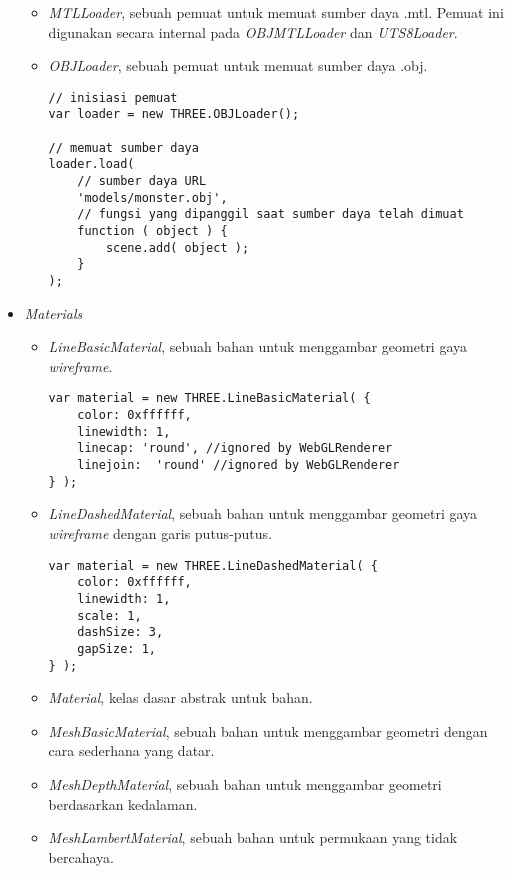 \begin{itemize}
\begin{itemize}
	\item {\it MTLLoader}, sebuah pemuat untuk memuat sumber daya .mtl. Pemuat ini digunakan secara internal pada {\it OBJMTLLoader} dan {\it UTS8Loader}.
	
	\item {\it OBJLoader}, sebuah pemuat untuk memuat sumber daya .obj.
	
\begin{lstlisting}
// inisiasi pemuat
var loader = new THREE.OBJLoader();

// memuat sumber daya
loader.load(
	// sumber daya URL
	'models/monster.obj',
	// fungsi yang dipanggil saat sumber daya telah dimuat
	function ( object ) {
		scene.add( object );
	}
);
\end{lstlisting}

	\end{itemize}

\item \textit{Materials}

	\begin{itemize}
	\item {\it LineBasicMaterial}, sebuah bahan untuk menggambar geometri gaya {\it wireframe}.
	
\begin{lstlisting}
var material = new THREE.LineBasicMaterial( {
	color: 0xffffff,
	linewidth: 1,
	linecap: 'round', //ignored by WebGLRenderer
	linejoin:  'round' //ignored by WebGLRenderer
} );
\end{lstlisting}

	\item {\it LineDashedMaterial}, sebuah bahan untuk menggambar geometri gaya {\it wireframe} dengan garis putus-putus.
	
\begin{lstlisting}
var material = new THREE.LineDashedMaterial( {
	color: 0xffffff,
	linewidth: 1,
	scale: 1,
	dashSize: 3,
	gapSize: 1,
} );
\end{lstlisting}

	\item {\it Material}, kelas dasar abstrak untuk bahan.
	
	\item {\it MeshBasicMaterial}, sebuah bahan untuk menggambar geometri dengan cara sederhana yang datar.
	
	\item {\it MeshDepthMaterial}, sebuah bahan untuk menggambar geometri berdasarkan kedalaman.
	
	\item {\it MeshLambertMaterial}, sebuah bahan untuk permukaan yang tidak bercahaya.
	

\end{itemize}
\end{itemize}
